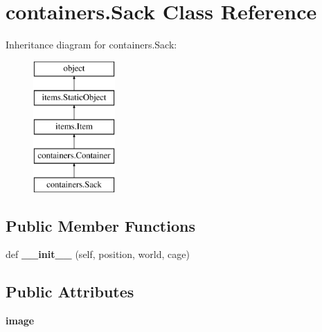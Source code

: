 \hypertarget{classcontainers_1_1_sack}{}\section{containers.\+Sack Class Reference}
\label{classcontainers_1_1_sack}
Inheritance diagram for containers.\+Sack\+:\begin{figure}[H]
\begin{center}
\leavevmode
\includegraphics[height=5.000000cm]{classcontainers_1_1_sack}
\end{center}
\end{figure}
\subsection*{Public Member Functions}
\begin{DoxyCompactItemize}
\item 
\hypertarget{classcontainers_1_1_sack_a24e751835fb062876caebe1f3fa43fa8}{}def {\bfseries \+\_\+\+\_\+init\+\_\+\+\_\+} (self, position, world, cage)\label{classcontainers_1_1_sack_a24e751835fb062876caebe1f3fa43fa8}

\end{DoxyCompactItemize}
\subsection*{Public Attributes}
\begin{DoxyCompactItemize}
\item 
\hypertarget{classcontainers_1_1_sack_adff272ce085b7243687fd9ecc358b1eb}{}{\bfseries image}\label{classcontainers_1_1_sack_adff272ce085b7243687fd9ecc358b1eb}

\end{DoxyCompactItemize}
